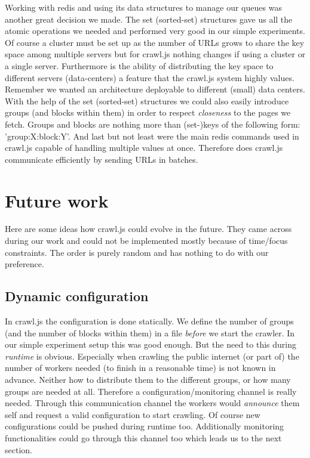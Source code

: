 Working with redis and using its data structures to manage our queues was another great decision we made. The set (sorted-set) structures gave us all the atomic operations we needed and performed very good in our simple experiments. Of course a cluster must be set up as the number of URLs grows to share the key space among multiple servers but for crawl.js nothing changes if using a cluster or a single server. Furthermore is the ability of distributing the key space to different servers (data-centers) a feature that the crawl.js system highly values. Remember we wanted an architecture deployable to different (small) data centers.
\newline
With the help of the set (sorted-set) structures we could also easily introduce groups (and blocks within them) in order to respect \emph{closeness} to the pages we fetch. Groups and blocks are nothing more than (set-)keys of the following form: 'group:X:block:Y'. And last but not least were the main redis commands used in crawl.js capable of handling multiple values at once. Therefore does crawl.js communicate efficiently by sending URLs in batches.

\section{Future work}
Here are some ideas how crawl.js could evolve in the future. They came across during our work and could not be implemented mostly because of time/focus constraints. The order is purely random and has nothing to do with our preference.

\subsection{Dynamic configuration}
In crawl.js the configuration is done statically. We define the number of groups (and the number of blocks within them) in a file \emph{before} we start the crawler. In our simple experiment setup this was good enough. But the need to this during \emph{runtime} is obvious. Especially when crawling the public internet (or part of) the number of workers needed (to finish in a reasonable time) is not known in advance. Neither how to distribute them to the different groups, or how many groups are needed at all. Therefore a configuration/monitoring channel is really needed. Through this communication channel the workers would \emph{announce} them self and request a valid configuration to start crawling. Of course new configurations could be pushed during runtime too. Additionally monitoring functionalities could go through this channel too which leads us to the next section. 

